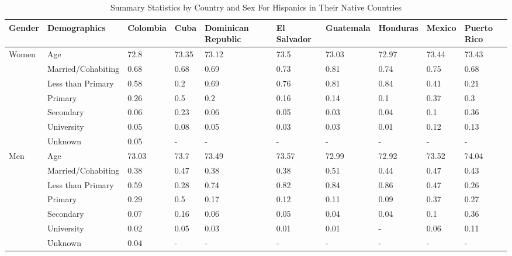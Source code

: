 \begin{table}[ht]
\centering
\caption{Summary Statistics by Country and Sex For Hispanics in Their Native Countries} 
\label{table1}
\begingroup\small
\begin{tabular}{l|l|llllllll}
  \hline
Gender & Demographics & Colombia & Cuba & Dominican Republic & El Salvador & Guatemala & Honduras & Mexico & Puerto Rico \\ 
  \hline
Women & Age & 72.8 & 73.35 & 73.12 & 73.5 & 73.03 & 72.97 & 73.44 & 73.43 \\ 
   & Married/Cohabiting & 0.68 & 0.68 & 0.69 & 0.73 & 0.81 & 0.74 & 0.75 & 0.68 \\ 
   & Less than Primary & 0.58 & 0.2 & 0.69 & 0.76 & 0.81 & 0.84 & 0.41 & 0.21 \\ 
   & Primary & 0.26 & 0.5 & 0.2 & 0.16 & 0.14 & 0.1 & 0.37 & 0.3 \\ 
   & Secondary & 0.06 & 0.23 & 0.06 & 0.05 & 0.03 & 0.04 & 0.1 & 0.36 \\ 
   & University & 0.05 & 0.08 & 0.05 & 0.03 & 0.03 & 0.01 & 0.12 & 0.13 \\ 
   & Unknown & 0.05 & - & - & - & - & - & - & - \\ 
  Men & Age & 73.03 & 73.7 & 73.49 & 73.57 & 72.99 & 72.92 & 73.52 & 74.04 \\ 
   & Married/Cohabiting & 0.38 & 0.47 & 0.38 & 0.38 & 0.51 & 0.44 & 0.47 & 0.43 \\ 
   & Less than Primary & 0.59 & 0.28 & 0.74 & 0.82 & 0.84 & 0.86 & 0.47 & 0.26 \\ 
   & Primary & 0.29 & 0.5 & 0.17 & 0.12 & 0.11 & 0.09 & 0.37 & 0.27 \\ 
   & Secondary & 0.07 & 0.16 & 0.06 & 0.05 & 0.04 & 0.04 & 0.1 & 0.36 \\ 
   & University & 0.02 & 0.05 & 0.03 & 0.01 & 0.01 & - & 0.06 & 0.11 \\ 
   & Unknown & 0.04 & - & - & - & - & - & - & - \\ 
   \hline
\end{tabular}
\endgroup
\end{table}
